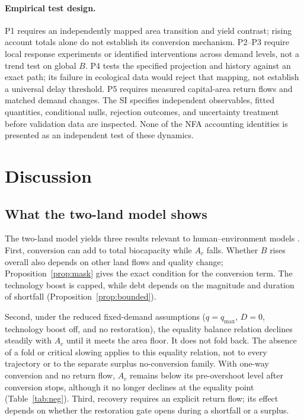 \documentclass[preprint,12pt,authoryear]{elsarticle}
\begin{document}
\paragraph{Empirical test design.} P1 requires an independently mapped area transition and yield contrast; rising account totals alone do not establish its conversion mechanism. P2--P3 require local response experiments or identified interventions across demand levels, not a trend test on global $B$. P4 tests the specified projection and history against an exact path; its failure in ecological data would reject that mapping, not establish a universal delay threshold. P5 requires measured capital-area return flows and matched demand changes. The SI specifies independent observables, fitted quantities, conditional nulls, rejection outcomes, and uncertainty treatment before validation data are inspected. None of the NFA accounting identities is presented as an independent test of these dynamics.
\clearpage
\section{Discussion}\label{sec:discussion}

\subsection{What the two-land model shows}

The two-land model yields three results relevant to human--environment models \citep{Schaefer1954,May1973,Meadows1972,Meadows2004,WackernagelRees1996,BranderTaylor1998}. First, conversion can add to total biocapacity while $A_c$ falls. Whether $B$ rises overall also depends on other land flows and quality change; Proposition~\ref{prop:mask} gives the exact condition for the conversion term. The technology boost is capped, while debt depends on the magnitude and duration of shortfall (Proposition~\ref{prop:bounded}).

Second, under the reduced fixed-demand assumptions ($q=q_{\max}$, $D=0$, technology boost off, and no restoration), the equality balance relation declines steadily with $A_c$ until it meets the area floor. It does not fold back. The absence of a fold or critical slowing applies to this equality relation, not to every trajectory or to the separate surplus no-conversion family. With one-way conversion and no return flow, $A_c$ remains below its pre-overshoot level after conversion stops, although it no longer declines at the equality point (Table~\ref{tab:neg}). Third, recovery requires an explicit return flow; its effect depends on whether the restoration gate opens during a shortfall or a surplus.
\end{document}
